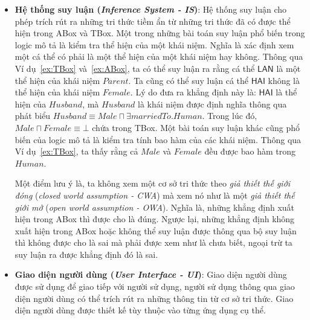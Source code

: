 \documentclass[12pt,a4paper,twoside]{report}
\newcommand{\mand}		{\sqcap}
\newcommand{\E}			{\exists}
\newcommand{\Human}			{Human}
\newcommand{\Female}		{Female}
\newcommand{\Male}			{Male}
\newcommand{\Parent}		{Parent}
\newcommand{\Husband}		{Husband}
\newcommand{\marriedTo}		{marriedTo}
\theoremstyle{definition}
\begin{document}
\begin{itemize}
  \item \textbf{Hệ thống suy luận ({\em Inference System - IS})}: Hệ thống suy luận cho phép trích rút ra những tri thức tiềm ẩn từ những tri thức đã có được thể hiện trong ABox và TBox.
  Một trong những bài toán suy luận phổ biến trong logic mô tả là kiểm tra thể hiện của một khái niệm. Nghĩa là xác định xem một cá thể có phải là một thể hiện của một khái niệm hay không. Thông qua Ví dụ~\ref{ex:TBox} và~\ref{ex:ABox}, ta có thể suy luận ra rằng cá thể $\mathsf{LAN}$ là một thể hiện của khái niệm $\Parent$. Ta cũng có thể suy luận cá thể $\mathsf{HAI}$ không là thể hiện của khái niệm $\Female$. Lý do đưa ra khẳng định này là: $\mathsf{HAI}$ là thể hiện của $\Husband$, mà $\Husband$ là khái niệm được định nghĩa thông qua phát biểu $\Husband \equiv \Male \mand \E \marriedTo.\Human$. Trong lúc đó, $\Male \mand \Female \equiv \bot$ chứa trong TBox.
  Một bài toán suy luận khác cũng phổ biến của logic mô tả là kiểm tra tính bao hàm của các khái niệm. Thông qua Ví dụ~\ref{ex:TBox}, ta thấy rằng cả $\Male$ và $\Female$ đều được bao hàm trong $\Human$. 
  
  Một điểm lưu ý là, ta không xem một cơ sở tri thức theo {\em giả thiết thế giới đóng} ({\em closed world assumption - CWA}) mà xem nó như là một {\em giả thiết thế giới mở} ({\em open world assumption - OWA}). Nghĩa là, những khẳng định xuất hiện trong ABox thì được cho là đúng. Ngược lại, những khẳng định không xuất hiện trong ABox hoặc không thể suy luận được thông qua bộ suy luận thì không được cho là sai mà phải được xem như là chưa biết, ngoại trừ ta suy luận ra được khẳng định đó là sai.

  \item \textbf{Giao diện người dùng ({\em User Interface - UI})}: Giao diện người dùng được sử dụng để giao tiếp với người sử dụng, người sử dụng thông qua giao diện người dùng có thể trích rút ra những thông tin từ cơ sở tri thức. Giao diện người dùng được thiết kế tùy thuộc vào từng ứng dụng cụ thể.  
\end{itemize}

\end{document}

